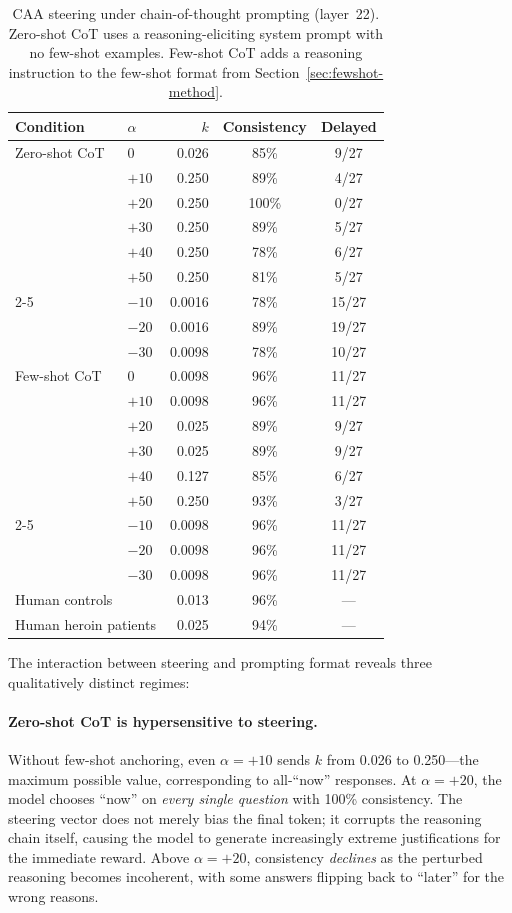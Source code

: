 \begin{table}[H]
\centering
\caption{CAA steering under chain-of-thought prompting (layer~22). Zero-shot CoT uses a reasoning-eliciting system prompt with no few-shot examples. Few-shot CoT adds a reasoning instruction to the few-shot format from Section~\ref{sec:fewshot-method}.}
\label{tab:caa-cot}
\begin{tabular}{llrcc}
\toprule
\textbf{Condition} & \textbf{$\alpha$} & \textbf{$k$} & \textbf{Consistency} & \textbf{Delayed} \\
\midrule
Zero-shot CoT & $0$ & 0.026 & 85\% & 9/27 \\
 & $+10$ & 0.250 & 89\% & 4/27 \\
 & $+20$ & 0.250 & 100\% & 0/27 \\
 & $+30$ & 0.250 & 89\% & 5/27 \\
 & $+40$ & 0.250 & 78\% & 6/27 \\
 & $+50$ & 0.250 & 81\% & 5/27 \\
\cmidrule{2-5}
 & $-10$ & 0.0016 & 78\% & 15/27 \\
 & $-20$ & 0.0016 & 89\% & 19/27 \\
 & $-30$ & 0.0098 & 78\% & 10/27 \\
\midrule
Few-shot CoT & $0$ & 0.0098 & 96\% & 11/27 \\
 & $+10$ & 0.0098 & 96\% & 11/27 \\
 & $+20$ & 0.025 & 89\% & 9/27 \\
 & $+30$ & 0.025 & 89\% & 9/27 \\
 & $+40$ & 0.127 & 85\% & 6/27 \\
 & $+50$ & 0.250 & 93\% & 3/27 \\
\cmidrule{2-5}
 & $-10$ & 0.0098 & 96\% & 11/27 \\
 & $-20$ & 0.0098 & 96\% & 11/27 \\
 & $-30$ & 0.0098 & 96\% & 11/27 \\
\midrule
\multicolumn{2}{l}{Human controls} & 0.013 & 96\% & --- \\
\multicolumn{2}{l}{Human heroin patients} & 0.025 & 94\% & --- \\
\bottomrule
\end{tabular}
\end{table}

The interaction between steering and prompting format reveals three qualitatively distinct regimes:

\paragraph{Zero-shot CoT is hypersensitive to steering.} Without few-shot anchoring, even $\alpha = +10$ sends $k$ from 0.026 to 0.250---the maximum possible value, corresponding to all-``now'' responses. At $\alpha = +20$, the model chooses ``now'' on \emph{every single question} with 100\% consistency. The steering vector does not merely bias the final token; it corrupts the reasoning chain itself, causing the model to generate increasingly extreme justifications for the immediate reward. Above $\alpha = +20$, consistency \emph{declines} as the perturbed reasoning becomes incoherent, with some answers flipping back to ``later'' for the wrong reasons.

